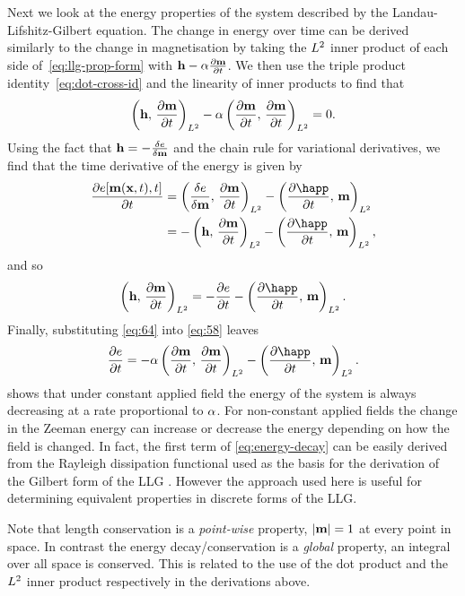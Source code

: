 Next we look at the energy properties of the system described by the Landau-Lifshitz-Gilbert equation.
The change in energy over time can be derived similarly to the change in magnetisation by taking the ${L^2}$ inner product of each side of~\cref{eq:llg-prop-form} with $\boldsymbol{\mathrm{h}} - \alpha \frac{\partial \boldsymbol{\mathrm{m}}}{\partial t}$.
We then use the triple product identity~\cref{eq:dot-cross-id} and the linearity of inner products to find that
\begin{equation}
  \label{eq:58}
  \left(\boldsymbol{\mathrm{h}},\, \frac{\partial \boldsymbol{\mathrm{m}}}{\partial t} \right)_{{L^2}} - \alpha \left(\frac{\partial \boldsymbol{\mathrm{m}}}{\partial t},\, \frac{\partial \boldsymbol{\mathrm{m}}}{\partial t} \right)_{{L^2}} = 0.
\end{equation}
Using the fact that $\boldsymbol{\mathrm{h}} = -\frac{\delta e}{\delta \boldsymbol{\mathrm{m}}}$ and the chain rule for variational derivatives, we find that the time derivative of the energy is given by
\begin{align*}
  \pd{\e[\mv(\xv, t), t]}{t} &= \ltip{\vd{e}{\mv}}{\dmdt} - \ltip{\pd{\happ}{t}}{\mv} \\
                             &= -\ltip{\hv}{\dmdt} - \ltip{\pd{\happ}{t}}{\mv},
\end{align*}
and so
\begin{equation}
  \ltip{\hv}{\dmdt} = -\pd{\e}{t} - \ltip{\pd{\happ}{t}}{\mv}.
  \label{eq:64}
\end{equation}
Finally, substituting \cref{eq:64} into \cref{eq:58} leaves
\begin{equation}
  \label{eq:energy-decay}
  \pd{\e}{t} = -\dampc \ltip{\dmdt}{\dmdt} - \ltip{\pd{\happ}{t}}{\mv}.
\end{equation}
 shows that under constant applied field the energy of the system is always decreasing at a rate proportional to $\alpha$.
For non-constant applied fields the change in the Zeeman energy can increase or decrease the energy depending on how the field is changed. %
In fact, the first term of \cref{eq:energy-decay} can be easily derived from the Rayleigh dissipation functional used as the basis for the derivation of the Gilbert form of the LLG \cite{Gilbert2004}.
However the approach used here is useful for determining equivalent properties in discrete forms of the LLG.

Note that length conservation is a \emph{point-wise} property, \ie $\left|{\boldsymbol{\mathrm{m}}} \right| = 1$ at every point in space.
In contrast the energy decay/conservation is a \emph{global} property, \ie an integral over all space is conserved.
This is related to the use of the dot product and the ${L^2}$ inner product respectively in the derivations above.


